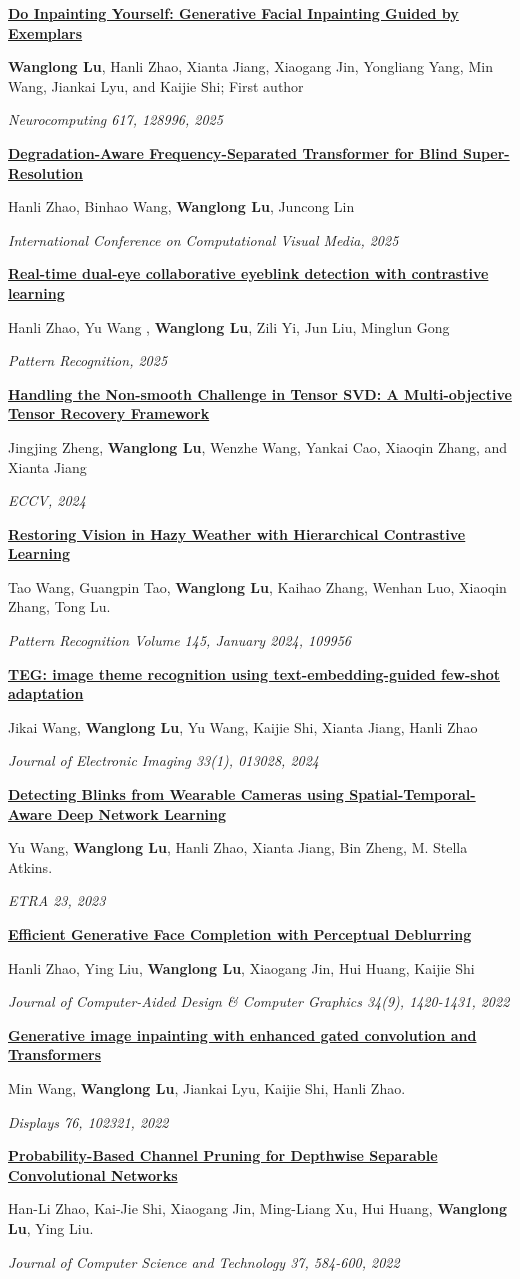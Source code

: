 \documentclass[11pt,letterpaper]{article}
\newcommand{\pubitem}[4]{\par\addvspace{6pt}\begin{minipage}{\linewidth}\href{#4}{\textbf{#1}}\par{\small #2}\par{\small\textit{#3}}\end{minipage}\par}
\begin{document}
\pubitem{Do Inpainting Yourself: Generative Facial Inpainting Guided by Exemplars}{\textbf{Wanglong Lu}, Hanli Zhao, Xianta Jiang, Xiaogang Jin, Yongliang Yang, Min Wang, Jiankai Lyu, and Kaijie Shi; First author}{Neurocomputing 617, 128996, 2025}{https://doi.org/10.1016/j.neucom.2024.128996}
\pubitem{Degradation-Aware Frequency-Separated Transformer for Blind Super-Resolution}{Hanli Zhao, Binhao Wang, \textbf{Wanglong Lu}, Juncong Lin}{International Conference on Computational Visual Media, 2025}{https://link.springer.com/chapter/10.1007/978-981-96-5809-1_13}
\pubitem{Real-time dual-eye collaborative eyeblink detection with contrastive learning}{Hanli Zhao, Yu Wang , \textbf{Wanglong Lu}, Zili Yi, Jun Liu, Minglun Gong}{Pattern Recognition, 2025}{https://www.sciencedirect.com/science/article/pii/S0031320325001001}
\pubitem{Handling the Non-smooth Challenge in Tensor SVD: A Multi-objective Tensor Recovery Framework}{Jingjing Zheng, \textbf{Wanglong Lu}, Wenzhe Wang, Yankai Cao, Xiaoqin Zhang, and Xianta Jiang}{ECCV, 2024}{https://arxiv.org/abs/2311.13958}
\pubitem{Restoring Vision in Hazy Weather with Hierarchical Contrastive Learning}{Tao Wang, Guangpin Tao, \textbf{Wanglong Lu}, Kaihao Zhang, Wenhan Luo, Xiaoqin Zhang, Tong Lu.}{Pattern Recognition Volume 145, January 2024, 109956}{https://doi.org/10.1016/j.patcog.2023.109956}
\pubitem{TEG: image theme recognition using text-embedding-guided few-shot adaptation}{Jikai Wang, \textbf{Wanglong Lu}, Yu Wang, Kaijie Shi, Xianta Jiang, Hanli Zhao}{Journal of Electronic Imaging 33(1), 013028, 2024}{https://doi.org/10.1117/1.JEI.33.1.013028}
\pubitem{Detecting Blinks from Wearable Cameras using Spatial-Temporal-Aware Deep Network Learning}{Yu Wang, \textbf{Wanglong Lu}, Hanli Zhao, Xianta Jiang, Bin Zheng, M. Stella Atkins.}{ETRA 23, 2023}{https://doi.org/10.1145/3588015.3589668}
\pubitem{Efficient Generative Face Completion with Perceptual Deblurring}{Hanli Zhao, Ying Liu, \textbf{Wanglong Lu}, Xiaogang Jin, Hui Huang, Kaijie Shi}{Journal of Computer-Aided Design \& Computer Graphics 34(9), 1420-1431, 2022}{https://longlongaaago.github.io/publication/efficient_generative_face_completion}
\pubitem{Generative image inpainting with enhanced gated convolution and Transformers}{Min Wang, \textbf{Wanglong Lu}, Jiankai Lyu, Kaijie Shi, Hanli Zhao.}{Displays 76, 102321, 2022}{https://doi.org/10.1016/j.displa.2022.102321}
\pubitem{Probability-Based Channel Pruning for Depthwise Separable Convolutional Networks}{Han-Li Zhao, Kai-Jie Shi, Xiaogang Jin, Ming-Liang Xu, Hui Huang, \textbf{Wanglong Lu}, Ying Liu.}{Journal of Computer Science and Technology 37, 584-600, 2022}{https://doi.org/10.1007/s11390-022-2131-8}
\end{document}
